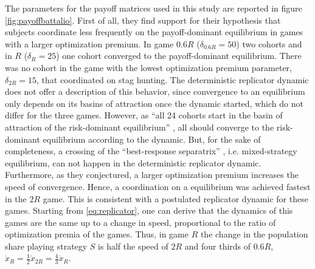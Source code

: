 The parameters for the payoff matrices used in this study 
are reported in figure \ref{fig:payoffbattalio}. 
First of all, they find support for their hypothesis that 
subjects coordinate less frequently on the 
payoff-dominant equilibrium in games with a larger optimization premium. 
In game $0.6R$ ($\delta_{0.6R}=50$) two cohorts and in $R$ ($\delta_{R}=25$)
one cohort converged to the payoff-dominant equilibrium. There was no
cohort in the game with the lowest optimization premium parameter, 
$\delta_{2R}= 15$, that coordinated on stag hunting.
The deterministic replicator dynamic does 
not offer a description of this behavior, since convergence to an 
equilibrium only depends on its basins of attraction once the dynamic 
started, which do not differ for the three games. 
However, as ``all 24 cohorts start in the basin of attraction
of the risk-dominant equilibrium'' 
\parencite[755]{battalio_optimization_2001}, all should converge to the 
risk-dominant equilibrium according to the dynamic.
But, for the sake of completeness, a crossing of the  
``best-response separatrix'' \parencite{battalio_optimization_2001}, i.e. 
mixed-strategy equilibrium, can not happen in the deterministic replicator 
dynamic. Furthermore, as they conjectured, a larger optimization premium 
increases the speed of convergence. Hence, a coordination on a equilibrium 
was achieved fastest in the $2R$ game. This is consistent with a 
postulated replicator dynamic for these games. Starting from 
\eqref{eq:replicator}, one can derive that the dynamics of this 
games are the same up to a change in speed, proportional to the ratio of 
optimization premia of the games. Thus, in game $R$ the change 
in the population share playing strategy $S$ is half the 
speed of $2R$ and four thirds of $0.6R$,
$\dot{x}_{R} = \frac 12 \dot{x}_{2R} = \frac{4}{3}\dot{x}_R$.

